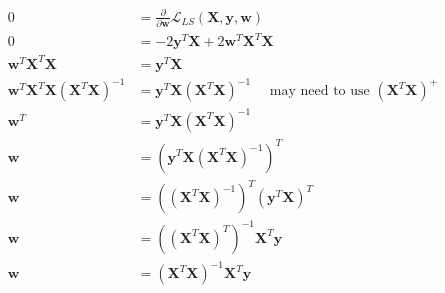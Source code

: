 \newcommand{\matrix}[1]{\mathbf{#1}}
\newcommand{\vector}[1]{\mathbf{#1}}
\newcommand{\X}{\matrix{X}}
\newcommand{\y}{\vector{y}}
\newcommand{\w}{\vector{w}}
\begin{align*}
0 &= \frac{\partial}{\partial \w} \mathcal{L}_{LS} (\X,\y,\w) \\
0 &= -2\y^T\X + 2\w^T\X^T\X \\
\w^T\X^T\X &= \y^T\X \\
\w^T\X^T\X(\X^T\X)^{-1} &= \y^T\X(\X^T\X)^{-1} \quad \text{ may need to use } (\X^T\X)^+ \\
\w^T &= \y^T\X(\X^T\X)^{-1} \\
\w &= (\y^T\X(\X^T\X)^{-1})^T \\
\w &= ((\X^T\X)^{-1})^T (\y^T\X)^T \\
\w &= ((\X^T\X)^T)^{-1} \X^T\y \\
\w &= (\X^T\X)^{-1} \X^T\y \\
\end{align*}
